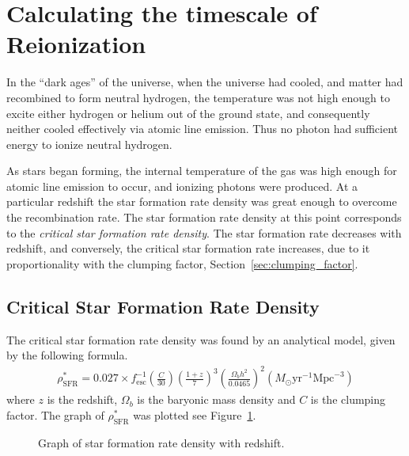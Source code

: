 \section{Calculating the timescale of Reionization} %
\label{sec:calculating_the_timescale_of_reionization}

	In the ``dark ages'' of the universe, when the universe had cooled, and matter had recombined to form neutral hydrogen, the temperature was not high enough to excite either hydrogen or helium out of the ground state, and consequently neither cooled effectively via atomic line emission. Thus no photon had sufficient energy to ionize neutral hydrogen.

	As stars began forming, the internal temperature of the gas was high enough for atomic line emission to occur, and ionizing photons were produced. At a particular redshift the star formation rate density was great enough to overcome the recombination rate. The star formation rate density at this point corresponds to the \emph{critical star formation rate density}. The star formation rate decreases with redshift, and conversely, the critical star formation rate increases, due to it proportionality with the clumping factor, Section~\ref{sec:clumping_factor}.

	\subsection{Critical Star Formation Rate Density} %
	\label{sub:critical_star_formation_rate_density}
		The critical star formation rate density was found by an analytical model, given by the following formula\cite{Pawlik:2009ij}.
		\begin{align}
			\rho^*_\text{SFR} = 0.027 \times f^{-1}_\text{esc} \left (\frac{C}{30} \right ) \left (\frac{1+z}{7} \right )^3 \left (\frac{\Omega_b h^2}{0.0465} \right )^2 (M_\odot \text{yr}^{-1} \text{Mpc}^{-3})
		\end{align}
		where $z$ is the redshift, $\Omega_b$ is the baryonic mass density and $C$ is the clumping factor. The graph of $\rho^*_\text{SFR}$ was plotted see Figure~\ref{fig:GRAPH_SFR_Density}.
		\begin{figure}[!htbp]
			\centering
				\begingroup{}
					\resizebox{0.8\textwidth}{!}{%
						
					}\endgroup
			\caption{Graph of star formation rate density with redshift.\label{fig:GRAPH_SFR_Density}}
		\end{figure}

